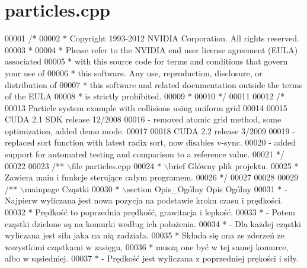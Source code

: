 \hypertarget{particles_8cpp_source}{\section{particles.\-cpp}
}

\begin{DoxyCode}
00001 \textcolor{comment}{/*}
00002 \textcolor{comment}{ * Copyright 1993-2012 NVIDIA Corporation.  All rights reserved.}
00003 \textcolor{comment}{ *}
00004 \textcolor{comment}{ * Please refer to the NVIDIA end user license agreement (EULA) associated}
00005 \textcolor{comment}{ * with this source code for terms and conditions that govern your use of}
00006 \textcolor{comment}{ * this software. Any use, reproduction, disclosure, or distribution of}
00007 \textcolor{comment}{ * this software and related documentation outside the terms of the EULA}
00008 \textcolor{comment}{ * is strictly prohibited.}
00009 \textcolor{comment}{ *}
00010 \textcolor{comment}{ */}
00011 
00012 \textcolor{comment}{/*}
00013 \textcolor{comment}{    Particle system example with collisions using uniform grid}
00014 \textcolor{comment}{}
00015 \textcolor{comment}{    CUDA 2.1 SDK release 12/2008}
00016 \textcolor{comment}{    - removed atomic grid method, some optimization, added demo mode.}
00017 \textcolor{comment}{}
00018 \textcolor{comment}{    CUDA 2.2 release 3/2009}
00019 \textcolor{comment}{    - replaced sort function with latest radix sort, now disables v-sync.}
00020 \textcolor{comment}{    - added support for automated testing and comparison to a reference value.}
00021 \textcolor{comment}{*/}
00022 
00023 \textcolor{comment}{/** \(\backslash\)file particles.cpp}
00024 \textcolor{comment}{ * \(\backslash\)brief Główny plik projektu.}
00025 \textcolor{comment}{ * Zawiera main i funkcje sterujące całym programem.}
00026 \textcolor{comment}{ */}
00027 
00028 
00029 \textcolor{comment}{/** \(\backslash\)mainpage Cząstki}
00030 \textcolor{comment}{ * \(\backslash\)section Opis\_Ogólny Opis Ogólny}
00031 \textcolor{comment}{ * - Najpierw wyliczana jest nowa pozycja na podstawie kroku czasu i prędkości.}
00032 \textcolor{comment}{ * Prędkość to poprzednia prędkość, grawitacja i lepkość.}
00033 \textcolor{comment}{ * - Potem cząstki dzielone są na komurki według ich położenia.}
00034 \textcolor{comment}{ * - Dla każdej cząstki wyliczana jest siła jaka na nią zadziała.}
00035 \textcolor{comment}{ * Składa się ona ze zderzeń ze wszystkimi cząstkami w zasięgu,}
00036 \textcolor{comment}{ * muszą one być w tej samej komurce, albo w sąsiedniej.}
00037 \textcolor{comment}{ * - Prędkość jest wyliczana z poprzedniej prękości i siły.}

\end{DoxyCode}
